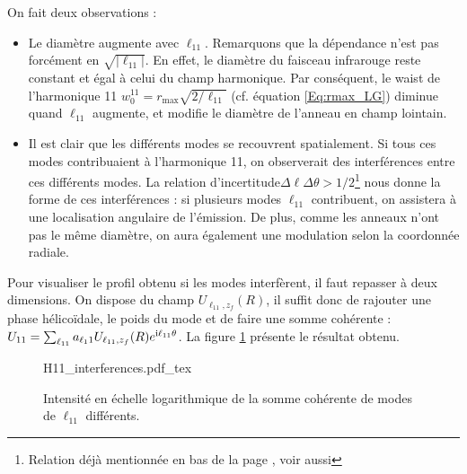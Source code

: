 On fait deux observations :
\begin{itemize} 
\item Le diamètre augmente avec $\ell_{11}$. Remarquons que la dépendance n'est pas forcément en $\sqrt{|\ell_{11}|}$. En effet, le diamètre du faisceau infrarouge reste constant et égal à celui du champ harmonique. Par conséquent, le waist de l'harmonique 11 $w_0^{11}=r_{\mathrm{max}}\sqrt{2/\ell_{11}}$ (cf. équation \ref{Eq:rmax_LG}) diminue quand $\ell_{11}$ augmente, et modifie le diamètre de l'anneau en champ lointain.\\
\item Il est clair que les différents modes se recouvrent spatialement. Si tous ces modes contribuaient à l'harmonique 11, on observerait des interférences entre ces différents modes. La relation d'incertitude$\Delta\ell\Delta\theta>1/2$\footnote{Relation déjà mentionnée en bas de la page \pageref{footnote:angle_oam}, voir aussi } nous donne la forme de ces interférences : si plusieurs modes $\ell_{11}$ contribuent, on assistera à une localisation angulaire de l'émission. De plus, comme les anneaux n'ont pas le même diamètre, on aura également une modulation selon la coordonnée radiale.\\
\end{itemize}

Pour visualiser le profil obtenu si les modes interfèrent, il faut repasser à deux dimensions. On dispose du champ $U_{\ell_{11},z_f}(R)$, il suffit donc de rajouter une phase hélicoïdale, le poids du mode et de faire une somme cohérente : $U_{11}=\sum_{\ell_{11}} a_{\ell_11} U_{\ell_{11},z_f}(R)e^{\mathrm{i}\ell_{11}\theta}$. La figure \ref{Fig:H11_interf} présente le résultat obtenu.

\begin{figure}[!ht]
\centering
\def\svgwidth{\columnwidth}
{H11_interferences.pdf_tex}
\caption{Intensité en échelle logarithmique de la somme cohérente de modes de $\ell_{11}$ différents.}
\label{Fig:H11_interf}
\end{figure}

